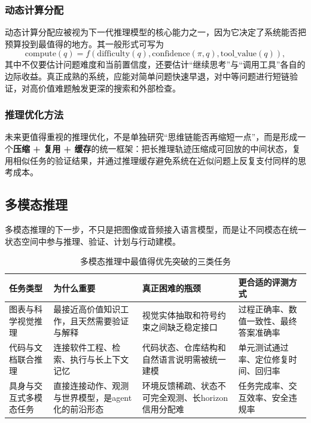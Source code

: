 \documentclass[12pt,a4paper]{article}
\begin{document}
\subsubsection{动态计算分配}

动态计算分配应被视为下一代推理模型的核心能力之一，因为它决定了系统能否把预算投到最值得的地方。其一般形式可写为
\begin{equation}
\text{compute}(q) = f(\text{difficulty}(q), \text{confidence}(\pi, q), \text{tool\_value}(q)),
\end{equation}
其中不仅要估计问题难度和当前置信度，还要估计“继续思考”与“调用工具”各自的边际收益。真正成熟的系统，应能对简单问题快速早退，对中等问题进行短链验证，对高价值难题触发更深的搜索和外部检查。

\subsubsection{推理优化方法}

未来更值得重视的推理优化，不是单独研究“思维链能否再缩短一点”，而是形成一个\textbf{压缩 + 复用 + 缓存}的统一框架：把长推理轨迹压缩成可回放的中间状态，复用相似任务的验证结果，并通过推理缓存避免系统在近似问题上反复支付同样的思考成本。

\subsection{多模态推理}

多模态推理的下一步，不只是把图像或音频接入语言模型，而是让不同模态在统一状态空间中参与推理、验证、计划与行动建模。

\begin{table}[H]
\centering
\small
\caption{多模态推理中最值得优先突破的三类任务}
\begin{tabular}{p{3.0cm}p{3.8cm}p{3.8cm}p{3.2cm}}
\toprule
\textbf{任务类型} & \textbf{为什么重要} & \textbf{真正困难的瓶颈} & \textbf{更合适的评测方式} \\
\midrule
图表与科学视觉推理 & 最接近高价值知识工作，且天然需要验证与解释 & 视觉实体抽取和符号约束之间缺乏稳定接口 & 过程正确率、数值一致性、最终答案准确率 \\
代码与文档联合推理 & 连接软件工程、检索、执行与长上下文记忆 & 代码状态、仓库结构和自然语言说明需被统一建模 & 单元测试通过率、定位修复时间、回归率 \\
具身与交互式多模态任务 & 直接连接动作、观测与世界模型，是agent化的前沿形态 & 环境反馈稀疏、状态不可完全观测、长horizon信用分配难 & 任务完成率、交互效率、安全违规率 \\
\bottomrule
\end{tabular}
\end{table}
\end{document}
